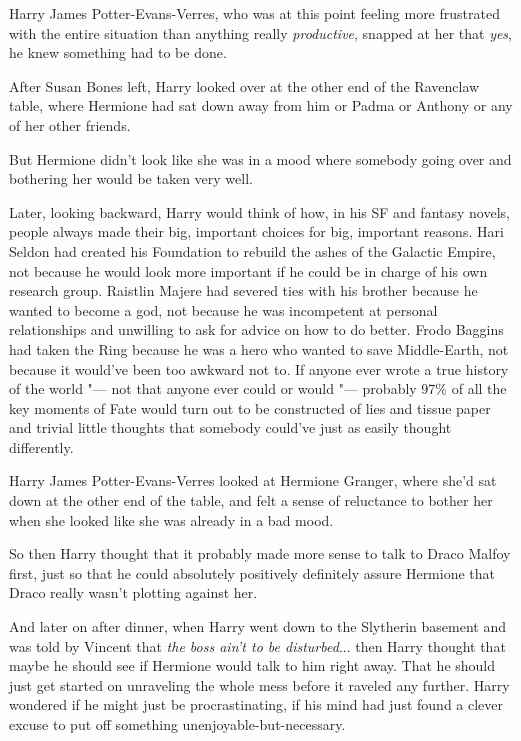 Harry James Potter-Evans-Verres, who was at this point feeling more
frustrated with the entire situation than anything really
\emph{productive}, snapped at her that \emph{yes}, he knew something had
to be done.

After Susan Bones left, Harry looked over at the other end of the
Ravenclaw table, where Hermione had sat down away from him or Padma or
Anthony or any of her other friends.

But Hermione didn't look like she was in a mood where somebody going
over and bothering her would be taken very well.

Later, looking backward, Harry would think of how, in his SF and fantasy
novels, people always made their big, important choices for big,
important reasons. Hari Seldon had created his Foundation to rebuild the
ashes of the Galactic Empire, not because he would look more important
if he could be in charge of his own research group. Raistlin Majere had
severed ties with his brother because he wanted to become a god, not
because he was incompetent at personal relationships and unwilling to
ask for advice on how to do better. Frodo Baggins had taken the Ring
because he was a hero who wanted to save Middle-Earth, not because it
would've been too awkward not to. If anyone ever wrote a true history of
the world "--- not that anyone ever could or would "--- probably 97\% of all
the key moments of Fate would turn out to be constructed of lies and
tissue paper and trivial little thoughts that somebody could've just as
easily thought differently.

Harry James Potter-Evans-Verres looked at Hermione Granger, where she'd
sat down at the other end of the table, and felt a sense of reluctance
to bother her when she looked like she was already in a bad mood.

So then Harry thought that it probably made more sense to talk to Draco
Malfoy first, just so that he could absolutely positively definitely
assure Hermione that Draco really wasn't plotting against her.

And later on after dinner, when Harry went down to the Slytherin
basement and was told by Vincent that \emph{the boss ain't to be
disturbed}... then Harry thought that maybe he should see if
Hermione would talk to him right away. That he should just get started
on unraveling the whole mess before it raveled any further. Harry
wondered if he might just be procrastinating, if his mind had just found
a clever excuse to put off something unenjoyable-but-necessary.

